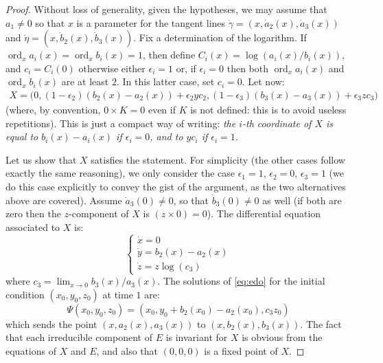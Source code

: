 \documentclass[a4paper,10pt]{amsart}
\DeclareMathOperator{\ord}{ord}
\begin{document}
\begin{proof}
  Without loss of generality, given the hypotheses, we may assume that $a_1\neq 0$ so that $x$ is a parameter for the tangent lines $\dot{\gamma}=(x,\dot{a}_2(x),\dot{a}_3(x))$ and $\dot{\eta}=(x,\dot{b}_2(x),\dot{b}_3(x))$. Fix a determination of the logarithm. If $\ord_xa_i(x)=\ord_xb_i(x)=1$, then define $C_{i}(x)=\log(a_i(x)/b_i(x))$, and $c_i=C_i(0)$ otherwise either $\epsilon_i=1$ or, if $\epsilon_i=0$ then both $\ord_xa_i(x)$ and $\ord_xb_i(x)$ are at least $2$. In this latter case, set $c_{i}=0$. Let now:
  \begin{multline*}
    X = \bigg(
      0,
      (1-\epsilon_2)(b_2(x)-a_2(x)) + \epsilon_2 yc_2,
      (1-\epsilon_3)(b_3(x)-a_3(x)) + \epsilon_3 zc_3
    \bigg)
  \end{multline*}
  (where, by convention, $0\times K=0$ even if $K$ is not defined: this is to avoid useless repetitions). This is just a compact way of writing: \emph{the $i$-th coordinate of $X$ is equal to $b_i(x)-a_i(x)$ if $\epsilon_i=0$, and to $yc_i$ if $\epsilon_i=1$.}

  Let us show that $X$ satisfies the statement. For simplicity (the other cases follow exactly the same reasoning), we only consider the case $\epsilon_1=1$, $\epsilon_2=0$, $\epsilon_3=1$ (we do this case explicitly to convey the gist of the argument, as the two alternatives above are covered). Assume $\dot{a}_3(0)\neq 0$, so that $\dot{b}_3(0)\neq 0$ as well (if both are zero then the $z$-component of $X$ is $(z\times 0)=0$). The differential equation associated to $X$ is:
  \begin{equation}\label{eq:edo}
    \left\{
      \begin{array}{l}
        \dot{x} = 0\\[.5em]
        \dot{y} = b_2(x)-a_2(x)\\[.5em]
        \dot{z} = z \log(c_3)
      \end{array}
    \right.
  \end{equation}
  where $c_3=\lim_{x\rightarrow0}b_3(x)/a_3(x)$. The solutions of \eqref{eq:edo} for the initial condition $(x_{0},y_{0},z_{0})$ at time $1$ are:
  \begin{equation*}
    \Psi(x_0,y_0,z_0) = \left( x_{0},
      y_0+b_2(x_{0})-a_2(x_{0}),
      c_3z_{0}
    \right)
  \end{equation*}
  which sends the point $(x,a_2(x),a_3(x))$ to $(x,b_2(x),b_3(x))$. The fact that each irreducible component of $E$ is invariant for $X$ is obvious from the equations of $X$ and $E$, and also that $(0,0,0)$ is a fixed point of $X$.
\end{proof}
\end{document}
